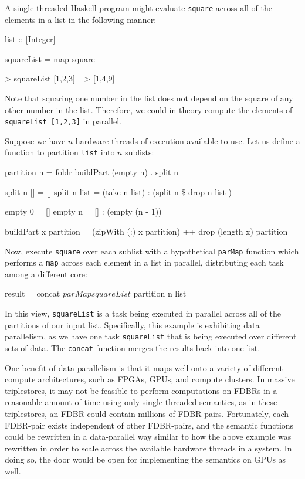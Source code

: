 \documentclass[../main.tex]{subfiles}
\begin{document}
A single-threaded Haskell program might evaluate \texttt{square} across all of the elements in a list in the following manner:

\begin{code}
	list :: [Integer]
	
	squareList = map square
	
	> squareList [1,2,3] => [1,4,9]
\end{code}

Note that squaring one number in the list does not depend on the square of any other number in the list.
Therefore, we could in theory compute the elements of \texttt{squareList [1,2,3]} in parallel.

Suppose we have $n$ hardware threads of execution available to use.  Let us define a function to partition \texttt{list} into $n$ sublists:

\begin{code}
  partition n = foldr buildPart (empty n) . split n
	
  split n [] = []
  split n list = (take n list) : (split n \$ drop n list )
	
  empty 0 = []
  empty n = [] : (empty (n - 1))
	
  buildPart x partition
    = (zipWith (:) x partition) ++ drop (length x) partition
	
\end{code}

Now, execute \texttt{square} over each sublist with a hypothetical \texttt{parMap} function which
performs a \texttt{map} across each element in a list in parallel, distributing each task among a different core:

\begin{code}
	result = concat $ parMap squareList $ partition n list
\end{code}

In this view, \texttt{squareList} is a task being executed in parallel across all of the partitions of our input list.
Specifically, this example is exhibiting data parallelism, as we have one task \texttt{squareList} that is being executed
over different sets of data.  The \texttt{concat} function merges the results back into one list.

One benefit of data parallelism is that it maps well onto a variety of different compute architectures, such as
FPGAs, GPUs, and compute clusters.  In massive triplestores, it may not be feasible to perform computations on
FDBRs in a reasonable amount of time using only single-threaded semantics, as in these triplestores,
an FDBR could contain millions of FDBR-pairs.  Fortunately, each FDBR-pair exists independent of other FDBR-pairs, and 
the semantic functions could be rewritten in a data-parallel way similar to how the above example was rewritten
in order to scale across the available hardware threads in a system.  In doing so, the door would be open for implementing
the semantics on GPUs as well.
\end{document}
